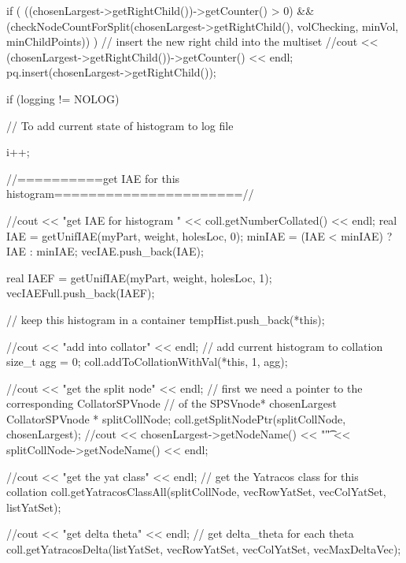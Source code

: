 \begin{DoxyCode}
{{{            if ( ((chosenLargest->getRightChild())->getCounter() > 0) 
            && (checkNodeCountForSplit(chosenLargest->getRightChild(),
                    volChecking, minVol, minChildPoints)) ) {
                // insert the new right child into the multiset
               //cout << (chosenLargest->getRightChild())->getCounter()  <<
       endl;
                pq.insert(chosenLargest->getRightChild());
            }

            if (logging != NOLOG) {
                // To add current state of histogram to log file               
          
                i++;
            }

          //==========get IAE for this histogram======================//
         
        //cout << "get IAE for histogram " << coll.getNumberCollated() << endl;
        real IAE = getUnifIAE(myPart, weight, holesLoc, 0);
        minIAE = (IAE < minIAE) ? IAE : minIAE;
        vecIAE.push_back(IAE); 
        
        real IAEF = getUnifIAE(myPart, weight, holesLoc, 1);
        vecIAEFull.push_back(IAEF); 

        // keep this histogram in a container 
        tempHist.push_back(*this);
        
        //cout << "add into collator" << endl;
        // add current histogram to collation
        size_t agg = 0;
        coll.addToCollationWithVal(*this, 1, agg);
          
        //cout << "get the split node" << endl;
        // first we need a pointer to the corresponding CollatorSPVnode 
        // of the SPSVnode* chosenLargest     
        CollatorSPVnode * splitCollNode;
        coll.getSplitNodePtr(splitCollNode, chosenLargest);
        //cout << chosenLargest->getNodeName() << "\t" <<
       splitCollNode->getNodeName() << endl;
        
        //cout << "get the yat class" << endl;
        // get the Yatracos class for this collation
        coll.getYatracosClassAll(splitCollNode, vecRowYatSet,
                            vecColYatSet, listYatSet);

        //cout << "get delta theta" << endl;
        // get delta_theta for each theta
        coll.getYatracosDelta(listYatSet, vecRowYatSet, vecColYatSet, 
                        vecMaxDeltaVec);

}}}
\end{DoxyCode}
